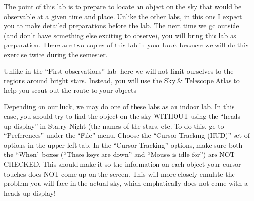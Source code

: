 
\noindent The point of this lab is to prepare to locate an object on the
sky that would be observable at a given time and place. Unlike the
other labs, in this one I expect you to make detailed preparations
before the lab. The next time we go outside (and don't have something
else exciting to observe), you will bring this lab as
preparation. There are two copies of this lab in your book because we
will do this exercise twice during the semester.

\noindent Unlike in the ``First observations'' lab, here we will not
limit ourselves to the regions around bright stars.  Instead, you will
use the Sky \& Telescope Atlas to help you scout out the route to your
objects.  

\noindent Depending on our luck, we may do one of these labs as an
indoor lab. In this case, you should try to find the object on the sky
WITHOUT using the ``heads-up display'' in Starry Night (the names of
the stars, etc.  To do this, go to ``Preferences'' under the ``File''
menu.  Choose the ``Cursor Tracking (HUD)'' set of options in the
upper left tab.  In the ``Cursor Tracking'' options, make sure both
the ``When'' boxes (``These keys are down'' and ``Mouse is idle for'')
are NOT CHECKED. This should make it so the information on each object
your cursor touches does NOT come up on the screen.  This will more
closely emulate the problem you will face in the actual sky, which
emphatically does not come with a heads-up display!

